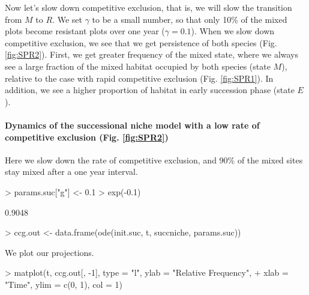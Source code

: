 Now let's slow down competitive exclusion, that is, we will slow the transition from $M$ to $R$. We set  $\gamma$ to be a small number, so that only 10\% of the mixed plots become resistant plots over one year ($\gamma=0.1$). When we slow down competitive exclusion, we see that we get persistence of both species (Fig. \ref{fig:SPR2}). First, we get greater frequency of the mixed state, where we always see a large fraction of the mixed habitat occupied by both species (state $M$), relative to the case with rapid competitive exclusion (Fig. \ref{fig:SPR1}). In addition, we see a higher proportion of habitat in early succession phase (state $E$).

\medskip \noindent
\begin{boxedminipage}{\linewidth}
  {\footnotesize
\paragraph{Dynamics of the successional niche model with a low rate of competitive exclusion (Fig. \ref{fig:SPR2})}
Here we slow down the rate of competitive exclusion, and 90\% of the mixed sites stay mixed after a one year interval.
\begin{Schunk}
\begin{Sinput}
> params.suc["g"] <- 0.1
> exp(-0.1)
\end{Sinput}
\begin{Soutput}
[1] 0.9048
\end{Soutput}
\begin{Sinput}
> ccg.out <- data.frame(ode(init.suc, t, succniche, params.suc))
\end{Sinput}
\end{Schunk}
We plot our projections.
\begin{Schunk}
\begin{Sinput}
> matplot(t, ccg.out[, -1], type = "l", ylab = "Relative Frequency", 
+     xlab = "Time", ylim = c(0, 1), col = 1)
\end{Sinput}
\end{Schunk}
}
\end{boxedminipage} \medskip

